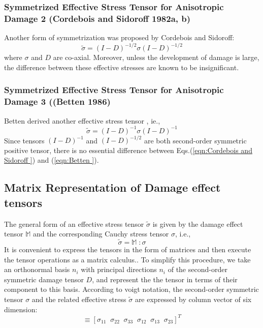 \documentclass[a4paper,12pt]{article}
\begin{document}
\subsubsection{Symmetrized Effective Stress Tensor for Anisotropic Damage 2 (Cordebois and Sidoroff 1982a, b)}
\indent\indent\indent Another form of symmetrization was proposed by Cordebois and Sidoroff:
\begin{equation}
\label{eqn:Cordebois and Sidoroff }
\tilde{\sigma} =  (I - D)^{-1/2}\sigma(I - D)^{-1/2}
\end{equation}
where $\sigma$ and $D$ are co-axial. Moreover, unless the development of damage is large, the difference between these effective stresses are known to be insignificant.\\
\subsubsection{Symmetrized Effective Stress Tensor for Anisotropic Damage 3 ((Betten 1986)}
\indent\indent\indent  Betten derived another effective stress tensor , ie.,
\begin{equation}
\label{eqn:Betten }
\tilde{\sigma} =  (I - D)^{-1}\sigma(I - D)^{-1}
\end{equation} 
Since tensors $(I - D)^{-1}$ and $(I - D)^{-1/2}$ are both second-order symmetric positive tensor, there is no essential difference between Eqs.(\ref{eqn:Cordebois and Sidoroff }) and (\ref{eqn:Betten }).

\subsection{Matrix Representation of Damage effect tensors}\label{Matrix Representation of Damage effect tensors}
\indent\indent\indent The general form of an effective stress tensor $\tilde{\sigma}$ is given by the damage effect tensor $\mathbb{M}$ and the corresponding Cauchy stress tensor $\sigma$, i.e.,
\begin{equation}
\tilde{\sigma}  = \mathbb{M} \; :  \sigma 
\label{eqn:effective_stress_tensor} 
\end{equation}
It is convenient to express the tensors in the form of matrices and then execute the tensor operations as a matrix calculus.. To simplify this procedure, we take an orthonormal basis ${n_{i}}$ with principal directions $n_{i}$ of the second-order symmetric damage tensor $D$, and represent the the tensor in terms of their component to this basis. According to voigt notation, the second-order symmetric tensor $\sigma$ and the related effective stress $\tilde{\sigma}$ are expressed by column vector of six dimension:
\begin{equation}
   [\sigma_{P}]  \equiv  [\sigma_{11} \;\; \sigma_{22} \;\;\sigma_{33} \;\;\sigma_{12} \;\;\sigma_{13} \;\;\sigma_{23} ]^{T}
\end{equation}
\end{document}
